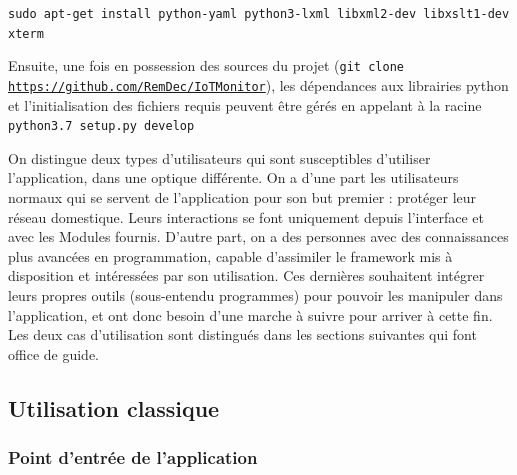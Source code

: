\documentclass[]{article}
\begin{document}
\indent \texttt{sudo apt-get install python-yaml python3-lxml libxml2-dev libxslt1-dev xterm}
\vspace{0.4cm}

\par Ensuite, une fois en possession des sources du projet (\texttt{git clone \url{https://github.com/RemDec/IoTMonitor}}), les dépendances aux librairies python et l'initialisation des fichiers requis peuvent être gérés en appelant à la racine~\\

\indent \texttt{python3.7 setup.py develop}
\vspace{0.4cm}

\par On distingue deux types d'utilisateurs qui sont susceptibles d'utiliser l'application, dans une optique différente. On a d'une part les utilisateurs normaux qui se servent de l'application pour son but premier : protéger leur réseau domestique. Leurs interactions se font uniquement depuis l'interface et avec les Modules fournis. D'autre part, on a des personnes avec des connaissances plus avancées en programmation, capable d'assimiler le framework mis à disposition et intéressées par son utilisation. Ces dernières souhaitent intégrer leurs propres outils (sous-entendu programmes) pour pouvoir les manipuler dans l'application, et ont donc besoin d'une marche à suivre pour arriver à cette fin. Les deux cas d'utilisation sont distingués dans les sections suivantes qui font office de guide.

\subsection{Utilisation classique}

\subsubsection{Point d'entrée de l'application}
\end{document}
